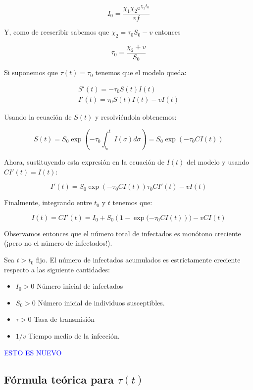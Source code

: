 \begin{equation}
I_0=\frac{\chi_1\chi_2\mathrm{e}^{\chi_2 t_0}}{vf}
\end{equation}

Y, como de reescribir sabemos que $\chi_2 = \tau_0 S_0-v$ entonces

\begin{equation}
\tau_0 = \frac{\chi_2+v}{S_0}
\end{equation}

Si suponemos que $\tau (t) = \tau_0$ tenemos que el modelo queda:

\begin{equation}
\begin{aligned}
S'(t) = -\tau_0S(t)I(t) \\
I'(t) = \tau_0S(t)I(t) -vI(t)
\end{aligned}
\end{equation}

Usando la ecuación de $S(t)$ y resolviéndola obtenemos:

$$S(t) = S_0\exp{\left( -\tau_0 \int_{t_0}^t I(\sigma ) d\sigma \right)} = S_0\exp{(-\tau_0 CI(t))}$$

Ahora, sustituyendo esta expresión en la ecuación de $I(t)$ del modelo y usando $CI'(t)=I(t)$:

$$I'(t) = S_0\exp{\left( -\tau_0 CI(t)\right) }\tau_0 CI'(t)-vI(t)$$

Finalmente, integrando entre $t_0$ y $t$ tenemos que:

$$I(t)=CI'(t)=I_0+S_0(1-\exp{(-\tau_0 CI(t)}))-vCI(t)$$

Observamos entonces que el número total de infectados es monótono creciente (¡pero no el número de infectados!). 

\begin{theorem}
Sea $t>t_0$ fijo. El número de infectados acumulados es estrictamente creciente respecto a las siguiente cantidades:
\begin{itemize}
\item $I_0>0$ Número inicial de infectados
\item $S_0>0$ Número inicial de individuos susceptibles.
\item $\tau>0$ Tasa de transmisión
\item $1/v$ Tiempo medio de la infección.
\end{itemize}
\end{theorem}

\textcolor{blue}{ESTO ES NUEVO}

\subsection{Fórmula teórica para $\tau (t)$}

